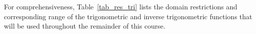 %
%




For comprehensiveness, Table~\ref{tab_res_tri} lists the domain restrictions and corresponding range of the trigonometric and inverse trigonometric functions that will be used throughout the remainder of this course.

